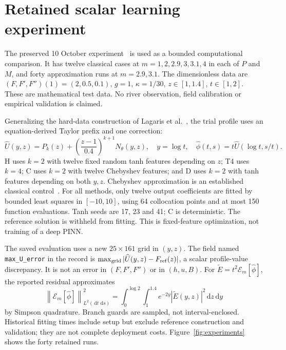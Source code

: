 \documentclass[12pt,a4paper,oneside]{report}
\numberwithin{equation}{chapter}
\theoremstyle{remark}\newtheorem{remark}[theorem]{Remark}
\newcommand{\dd}{\,\mathrm d}
\newcommand{\E}{\mathcal E}
\newcommand{\norm}[1]{\left\lVert#1\right\rVert}
\DeclareRobustCommand{\code}[1]{\nolinkurl{#1}}
\begin{document}
\section{Retained scalar learning experiment}\label{sec:experiment}
The preserved 10 October experiment~\cite{scalarartifact} is used as a bounded
computational comparison. It has twelve classical cases at
$m=1,2,2.9,3,3.1,4$ in each of $P$ and $M$, and forty approximation runs at
$m=2.9,3.1$. The dimensionless data are
$(F,F',F'')(1)=(2,0.5,0.1)$, $g=1$, $\kappa=1/30$,
$z\in[1,1.4]$, $t\in[1,2]$. These are mathematical test data.
No river observation, field calibration or empirical validation is claimed.

Generalizing the hard-data construction of Lagaris et al.~\cite{lagaris},
the trial profile uses an equation-derived Taylor prefix and one correction:
\begin{equation}\label{eq:lift}
 \widehat U(y,z)=P_k(z)+\left(\frac{z-1}{0.4}\right)^{k+1}N_\theta(y,z),
 \quad y=\log t,\quad \widehat\phi(t,s)=t\widehat U(\log t,s/t).
\end{equation}
H uses $k=2$ with twelve fixed random tanh features depending on $z$;
T4 uses $k=4$; C uses $k=2$ with twelve Chebyshev features; and D uses $k=2$
with tanh features depending on both $y,z$. Chebyshev approximation is an
established classical control~\cite[Ch.~6]{trefethen}. For all methods, only
twelve output coefficients are fitted by bounded least squares in $[-10,10]$,
using 64 collocation points and at most 150 function evaluations. Tanh seeds
are 17, 23 and 41; C is deterministic. The reference solution is withheld
from fitting. This is fixed-feature optimization, not training of a deep PINN.

The saved evaluation uses a new $25\times161$ grid in $(y,z)$.
The field named \code{max_U_error} in the record is
$\max_{\rm grid}|\widehat U(y,z)-F_{\rm ref}(z)|$, a scalar profile-value
discrepancy. It is not an error in $(F,F',F'')$ or in $(h,u,B)$.
For $\widetilde E=t^2\E_m[\widehat\phi]$, the reported residual approximates
\begin{equation}\label{eq:residual-measure}
 \norm{\E_m[\widehat\phi]}_{L^2(\dd t\,\dd s)}^2
 =\int_0^{\log2}\int_1^{1.4}e^{-2y}|\widetilde E(y,z)|^2\dd z\dd y
\end{equation}
by Simpson quadrature. Branch guards are sampled, not interval-enclosed.
Historical fitting times include setup but exclude reference construction and
validation; they are not complete deployment costs.
Figure~\ref{fig:experiments} shows the forty retained runs.
\end{document}
